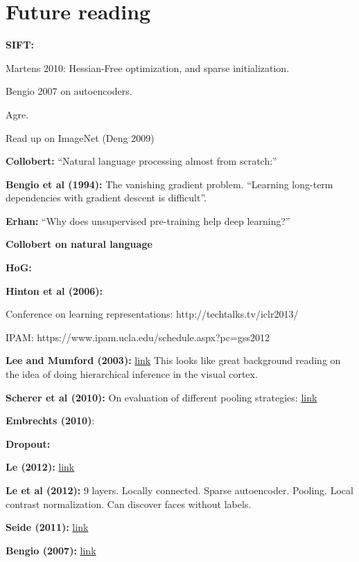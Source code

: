 \documentclass[12pt]{report}
\newcommand{\link}[2]{\href{#1}{#2}}
\begin{document}
\section{Future reading}

\textbf{SIFT:}

Martens 2010: Hessian-Free optimization, and sparse initialization.

Bengio 2007 on autoencoders.

Agre.

Read up on ImageNet (Deng 2009)

\textbf{Collobert:} ``Natural language processing almost from scratch:''

\textbf{Bengio et al (1994):} The vanishing gradient problem.
``Learning long-term dependencies with gradient descent is
difficult''.

\textbf{Erhan:} ``Why does unsupervised pre-training help deep learning?''

\textbf{Collobert on natural language}

\textbf{HoG:}

\textbf{Hinton et al (2006):}

Conference on learning representations: http://techtalks.tv/iclr2013/

IPAM: https://www.ipam.ucla.edu/schedule.aspx?pc=gss2012

\textbf{Lee and Mumford (2003):}
\link{http://dash.harvard.edu/bitstream/handle/1/3637109/Mumford\_HierarchBayesInfer.pdf?sequence=1}{link}
This looks like great background reading on the idea of doing
hierarchical inference in the visual cortex.

\textbf{Scherer et al (2010):} On evaluation of different pooling strategies: \link{http://www.ais.uni-bonn.de/papers/icann2010\_maxpool.pdf}{link}



\textbf{Embrechts (2010)}:

\textbf{Dropout:}

\textbf{Le (2012):} \link{https://plus.google.com/u/0/+ResearchatGoogle/posts/EMyhnBetd2F}{link}

\textbf{Le et al (2012):} 9 layers.  Locally connected.  Sparse
autoencoder.  Pooling.  Local contrast normalization.  Can discover
faces without labels.

\textbf{Seide (2011):}
\link{http://research.microsoft.com/apps/pubs/default.aspx?id=153169}{link}

\textbf{Bengio (2007):} \link{http://arxiv.org/pdf/1206.5533v2.pdf}{link}
\end{document}
